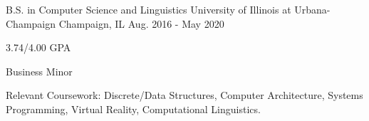 

\begin{cventries}

  \cventry
    {B.S. in Computer Science and Linguistics} %
    {University of Illinois at Urbana-Champaign} %
    {Champaign, IL} %
    {Aug. 2016 - May 2020} %
    {
      \begin{cvitems} %
        \item {3.74/4.00 GPA}
        \item {Business Minor}
        \item {Relevant Coursework: Discrete/Data Structures, Computer Architecture, Systems Programming, Virtual Reality, Computational Linguistics.}%
      \end{cvitems}
    }
    
\end{cventries}
